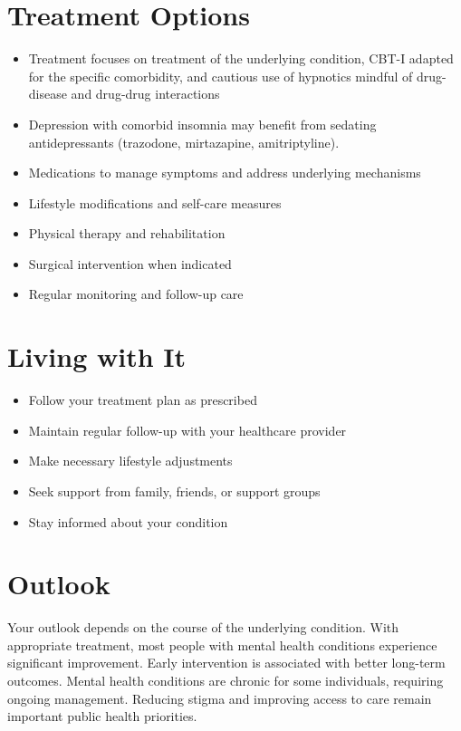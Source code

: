 \section{Treatment Options}
\begin{itemize}[noitemsep]
  \item Treatment focuses on treatment of the underlying condition, CBT-I adapted for the specific comorbidity, and cautious use of hypnotics mindful of drug-disease and drug-drug interactions
  \item Depression with comorbid insomnia may benefit from sedating antidepressants (trazodone, mirtazapine, amitriptyline).
  \item Medications to manage symptoms and address underlying mechanisms
  \item Lifestyle modifications and self-care measures
  \item Physical therapy and rehabilitation
  \item Surgical intervention when indicated
  \item Regular monitoring and follow-up care
\end{itemize}
\section{Living with It}
\begin{itemize}[noitemsep]
  \item Follow your treatment plan as prescribed
  \item Maintain regular follow-up with your healthcare provider
  \item Make necessary lifestyle adjustments
  \item Seek support from family, friends, or support groups
  \item Stay informed about your condition
\end{itemize}
\section{Outlook}
Your outlook depends on the course of the underlying condition. With appropriate treatment, most people with mental health conditions experience significant improvement. Early intervention is associated with better long-term outcomes. Mental health conditions are chronic for some individuals, requiring ongoing management. Reducing stigma and improving access to care remain important public health priorities.
